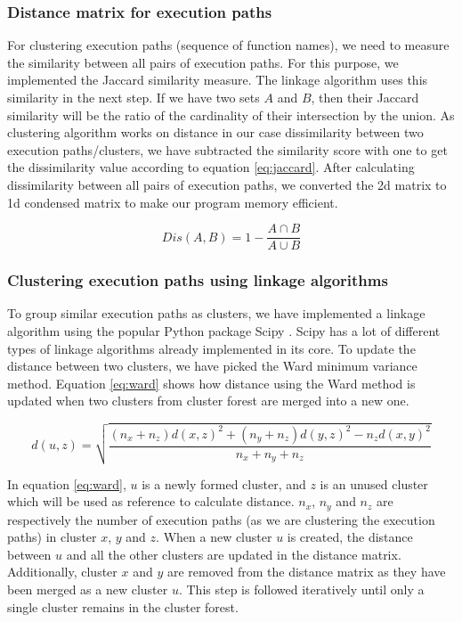 \subsubsection{Distance matrix for execution paths}

For clustering execution paths (sequence of function names), we need to measure the similarity between all pairs of execution paths. For this purpose, we  \cite{niwattanakul2013jaccardKeywordsSimilarity} implemented the Jaccard similarity measure. The linkage algorithm uses this similarity in the next step. If we have two sets $A$ and $B$, then their Jaccard similarity will be the ratio of the cardinality of their intersection by the union. As clustering algorithm works on distance in our case dissimilarity between two execution paths/clusters, we have subtracted the similarity score with one to get the dissimilarity value according to equation \ref{eq:jaccard}. After calculating dissimilarity between all pairs of execution paths, we converted the 2d matrix to 1d condensed matrix to make our program memory efficient.

\begin{equation}
Dis(A, B) = 1 - \frac{A\cap B}{A\cup B}
\label{eq:jaccard}
\end{equation}

\subsubsection{Clustering execution paths using linkage algorithms}

To group similar execution paths as clusters, we have implemented a linkage algorithm using the popular Python package Scipy \cite{scipy}. Scipy has a lot of different types of linkage algorithms already implemented in its core. To update the distance between two clusters, we have picked the Ward \cite{ward} minimum variance method. Equation \ref{eq:ward} \cite{scipy} shows how distance using the Ward method is updated when two clusters from cluster forest are merged into a new one.

\begin{equation}
     d(u, z) =   \sqrt{\frac{(n_x+n_z)d(x,z)^2+ (n_y+n_z)d(y,z)^2 - n_z d(x,y)^2 }{n_x+n_y+n_z}}
    \label{eq:ward}
\end{equation}

 
In equation \ref{eq:ward}, $u$ is a newly formed cluster, and $z$ is an unused cluster which will be used as reference to calculate distance. $n_x$, $n_y$ and $n_z$ are respectively the number of execution paths (as we are clustering the execution paths) in cluster $x$, $y$ and $z$.
When a new cluster $u$ is created, the distance between $u$ and all the other clusters are updated in the distance matrix. Additionally, cluster $x$ and $y$ are removed from the distance matrix as they have been merged as a new cluster $u$. This step is followed iteratively until only a single cluster remains in the cluster forest. 

